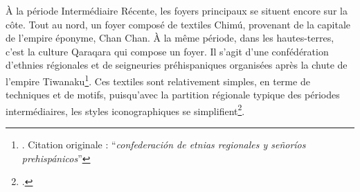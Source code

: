 À la période Intermédiaire Récente, les foyers principaux se situent encore sur la côte. Tout au nord, un foyer composé de textiles Chimú, provenant de la capitale de l'empire éponyme, Chan Chan. À la même période, dans les hautes-terres, c'est la culture Qaraqara qui compose un foyer. Il s'agit d'une \og confédération d'ethnies régionales et de seigneuries préhispaniques \fg \:organisées après la chute de l'empire Tiwanaku\footnote{\cite[p.~309]{oriasReviewQaraqaraCharkaMallku2009}. Citation originale : \textquotedblleft \textit{confederación de etnias regionales y señoríos prehispánicos}\textquotedblright}. Ces textiles sont relativement simples, en terme de techniques et de motifs, puisqu'avec la partition régionale typique des périodes intermédiaires, les styles iconographiques se simplifient\footcite[p.~288]{coveyMultiregionalPerspectivesArchaeology2008}.
